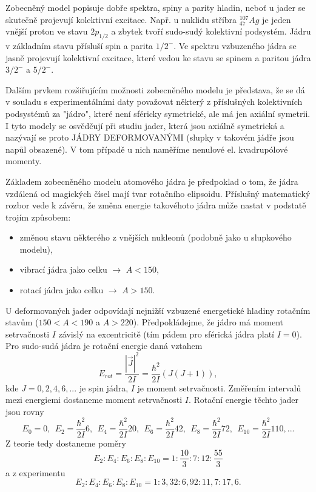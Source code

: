 \documentclass[../../main.tex]{subfiles}
\begin{document}
Zobecněný model popisuje dobře spektra, spiny a parity hladin, neboť u jader se skutečně projevují kolektivní excitace. Např. u nuklidu stříbra $^{107}_{47}Ag$ je jeden vnější proton  ve stavu $2p_{1/2}$ a zbytek tvoří sudo-sudý kolektivní podsystém. Jádru v základním stavu přísluší spin a parita $1/2 ^-$. Ve spektru vzbuzeného jádra se jasně projevují kolektivní excitace, které vedou ke stavu se spinem a paritou jádra $3/2 ^-$ a $5/2^-$. 

Dalším prvkem rozšiřujícím možnosti zobecněného modelu je představa, že se dá v souladu s experimentálními daty považovat některý z příslušných kolektivních podsystémů za "jádro", které není sféricky symetrické, ale má jen axiální symetrii. I tyto modely se osvědčují při studiu jader, která jsou axiálně symetrická a nazývají se proto JÁDRY DEFORMOVANÝMI (slupky v takovém jádře jsou napůl obsazené). V tom případě u nich naměříme nenulové el. kvadrupólové momenty.

Základem zobecněného modelu atomového jádra je předpoklad o tom, že jádra vzdálená od magických čísel mají tvar rotačního elipsoidu. Příslušný matematický rozbor vede k závěru, že změna energie takovéhoto jádra může nastat v podstatě trojím způsobem:
\begin{itemize}
	\item změnou stavu některého z vnějších nukleonů (podobně jako u slupkového modelu),
	\item vibrací jádra jako celku $\rightarrow$ $A<150$,
	\item rotací jádra jako celku $\rightarrow$ $A > 150$.
\end{itemize}

U deformovaných jader odpovídají nejnižší vzbuzené energetické hladiny rotačním stavům ($150<A<190$ a $A>220$). Předpokládejme, že jádro má moment setrvačnosti $I$ závislý na excentricitě (tím pádem pro sférická jádra platí $I=0$). Pro sudo-sudá jádra je rotační energie daná vztahem
\begin{equation}
E_{rot} = \dfrac{|\vec{J}|^2}{2I} = \dfrac{\hbar ^2}{2I} (J(J+1)),
\end{equation}
kde $J = 0,2,4,6,...$ je spin jádra, $I$ je moment setrvačnosti. Změřením intervalů mezi energiemi dostaneme moment setrvačnosti $I$. Rotační energie těchto jader jsou rovny
\begin{equation}
E_0 = 0, ~~ E_2 = \dfrac{\hbar ^2}{2I} 6, ~~ E_4 =  \dfrac{\hbar ^2}{2I} 20, ~~ E_6 =  \dfrac{\hbar ^2}{2I}42, ~~ E_8 =  \dfrac{\hbar ^2}{2I} 72, ~~ E_{10} =  \dfrac{\hbar ^2}{2I} 110, ...
\end{equation}
Z teorie tedy dostaneme poměry
\begin{equation}
E_2 : E_4 : E_6: E_8 : E_{10} = 1 :\dfrac{10}{3} : 7:12:\dfrac{55}{3}
\end{equation}
a z experimentu
\begin{equation}
E_2:E_4:E_6:E_8:E_{10} = 1:3,32:6,92:11,7:17,6.
\end{equation}
\end{document}
